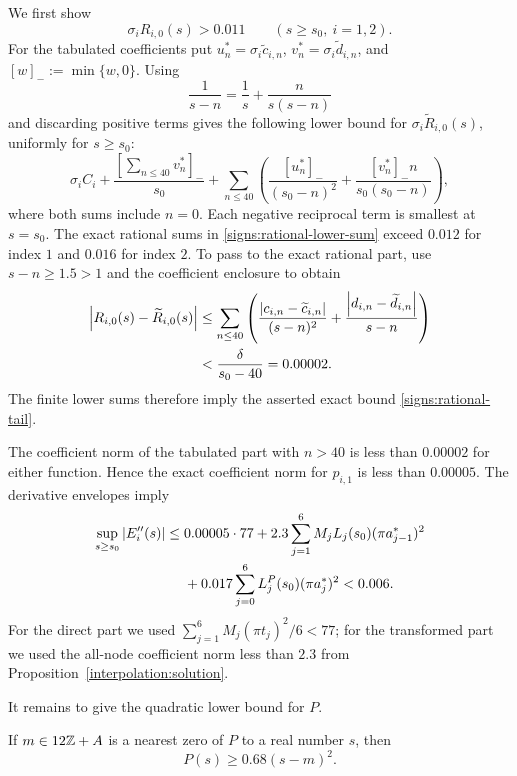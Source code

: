 We first show
\begin{equation}\label{signs:rational-tail}
  \sigma_i R_{i,0}(s)>0.011\qquad(s\ge s_0,\ i=1,2).
\end{equation}
For the tabulated coefficients put
$u_n^*=\sigma_i\widetilde c_{i,n}$,
$v_n^*=\sigma_i\widetilde d_{i,n}$, and $[w]_-:=\min\{w,0\}$.
Using
\[
 \frac{1}{s-n}=\frac1s+\frac{n}{s(s-n)}
\]
and discarding positive terms gives the following lower bound for
$\sigma_i\widetilde R_{i,0}(s)$, uniformly for $s\ge s_0$:
\begin{equation}\label{signs:rational-lower-sum}
 \sigma_i C_i+
 \frac{[\sum_{n\le40}v_n^*]_-}{s_0}
 +\sum_{n\le40}
    \left(\frac{[u_n^*]_-}{(s_0-n)^2}
          +\frac{[v_n^*]_-n}{s_0(s_0-n)}\right),
\end{equation}
where both sums include $n=0$.  Each negative reciprocal term is smallest
at $s=s_0$.  The exact rational sums in
\eqref{signs:rational-lower-sum} exceed $0.012$ for index $1$ and $0.016$
for index $2$.  To pass to the exact rational part, use $s-n\ge1.5>1$ and
the coefficient enclosure to obtain
\[
 \begin{split}
 \left\lvert R_{i,0}(s)-\widetilde R_{i,0}(s)\right\rvert
 &\le\sum_{n\le40}\left(
   \frac{\left\lvert c_{i,n}-\widetilde c_{i,n}\right\rvert}{(s-n)^2}
  +\frac{\left\lvert d_{i,n}-\widetilde d_{i,n}\right\rvert}{s-n}\right)\\
 &<\frac{\delta}{s_0-40}=0.00002.
 \end{split}
\]
The finite lower sums therefore imply the asserted exact bound
\eqref{signs:rational-tail}.

The coefficient norm of the tabulated part with $n>40$ is less than
$0.00002$ for either function.  Hence the exact coefficient norm for
$p_{i,1}$ is less than $0.00005$.  The derivative envelopes imply
\begin{align}\label{signs:tail-second-derivative}
 \sup_{s\ge s_0}\left\lvert E_i''(s)\right\rvert
 \le {}&0.00005\cdot77
       +2.3\sum_{j=1}^6 M_jL_j(s_0)(\pi a_{j-1}^*)^2
 \nonumber\\
       &+0.017\sum_{j=0}^6 L_j^P(s_0)(\pi a_j^*)^2
       <0.006.
\end{align}
For the direct part we used
$\sum_{j=1}^6 M_j(\pi t_j)^2/6<77$; for the transformed part we used the
all-node coefficient norm less than $2.3$ from
Proposition~\ref{interpolation:solution}.

It remains to give the quadratic lower bound for $P$.
\begin{lemma}\label{signs:P-lower-bound}
If $m\in12\mathbb Z+A$ is a nearest zero of $P$ to a real number $s$, then
\[
  P(s)\ge0.68(s-m)^2.
\]
\end{lemma}

